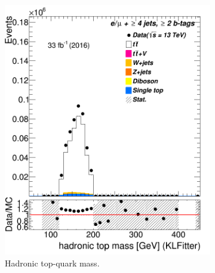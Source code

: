 \begin{figure}
\begin{subfigure}{0.35\textwidth}
		\includegraphics[width=\linewidth]{ControlPlots_emujets_2016_4incl_2incl/klf_topHad_m_emujets_2016.png}
		\caption{Hadronic top-quark mass.} \label{fig:21}
	\end{subfigure}	
	\hspace*{1.5cm}	
	\begin{subfigure}{0.35\textwidth}

\end{subfigure}
\end{figure}
